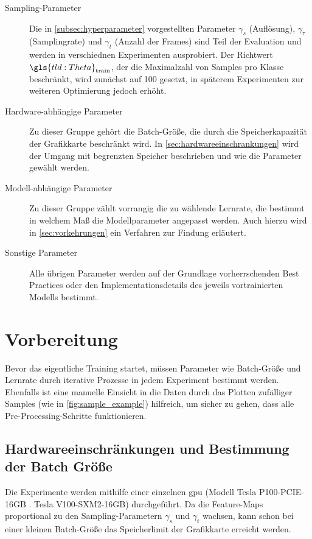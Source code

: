 \begin{description}
    \item[Sampling-Parameter] Die in \autoref{subsec:hyperparameter} vorgestellten Parameter $\gamma_s$ (Auflösung), $\gamma_\tau$ (Samplingrate) und $\gamma_t$ (Anzahl der Frames) sind Teil der Evaluation und werden in verschiednen Experimenten ausprobiert.
    Der Richtwert $\gls{tld:Theta}_\text{train}$, der die Maximalzahl von Samples pro Klasse beschränkt, wird zunächst auf 100 gesetzt, in späterem Experimenten zur weiteren Optimierung jedoch erhöht.
    \item[Hardware-abhängige Parameter]
    Zu dieser Gruppe gehört \zB die Batch-Größe, die durch die Speicherkapazität der Grafikkarte beschränkt wird.
    In \autoref{sec:hardwareeinschrankungen} wird der Umgang mit begrenzten Speicher beschrieben und wie die Parameter gewählt werden.
    \item[Modell-abhängige Parameter] Zu dieser Gruppe zählt vorrangig die zu wählende Lernrate, die bestimmt in welchem Maß die Modellparameter angepasst werden.
    Auch hierzu wird in \autoref{sec:vorkehrungen} ein Verfahren zur Findung erläutert.
    \item[Sonstige Parameter] Alle übrigen Parameter werden auf der Grundlage vorherrschenden Best Practices oder den Implementationsdetails des jeweils vortrainierten Modells bestimmt.
\end{description}

\section{Vorbereitung}

Bevor das eigentliche Training startet, müssen Parameter wie Batch-Größe und Lernrate durch iterative Prozesse in jedem Experiment bestimmt werden.
Ebenfalls ist eine manuelle Einsicht in die Daten durch das Plotten zufälliger Samples (wie in \autoref{fig:sample_example}) hilfreich, um sicher zu gehen, dass alle Pre-Processing-Schritte funktionieren.

\subsection{Hardwareeinschränkungen und Bestimmung der Batch Größe}
\label{sec:hardwareeinschrankungen}

Die Experimente werden mithilfe einer einzelnen \gls{gpu} (Modell Tesla P100-PCIE-16GB \bzw. Tesla V100-SXM2-16GB) durchgeführt.
Da die Feature-Maps proportional zu den Sampling-Parametern $\gamma_s$ und $\gamma_t$ wachsen, kann schon bei einer kleinen Batch-Größe das Speicherlimit der Grafikkarte erreicht werden.

